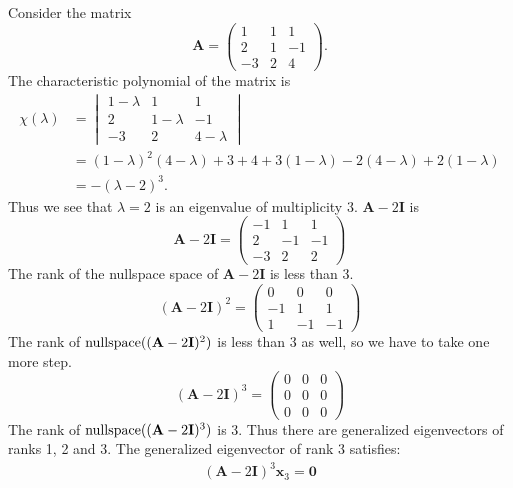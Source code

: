 \begin{Example}
  \label{example_gen_eigenvec_111}
  Consider the matrix
  \[
  \mathbf{A} = 
  \begin{pmatrix}
    1 & 1 & 1 \\
    2 & 1 & -1 \\
    -3 & 2 & 4 
  \end{pmatrix}.
  \]
  The characteristic polynomial of the matrix is
  \begin{align*}
    \chi(\lambda)
    &= \begin{vmatrix}
      1 - \lambda  & 1             & 1 \\
      2               & 1 - \lambda        & -1 \\
      -3              & 2             & 4 - \lambda
    \end{vmatrix} \\
    &= (1-\lambda)^2 (4 - \lambda) + 3 + 4 +3 (1-\lambda)
    -2 (4-\lambda) + 2 (1-\lambda) \\
    &= - (\lambda - 2)^3.
  \end{align*}
  Thus we see that $\lambda = 2$ is an eigenvalue of multiplicity 3.  
  $\mathbf{A} - 2 \mathbf{I}$ is
  \[
  \mathbf{A}  - 2 \mathbf{I}
  =
  \begin{pmatrix}
    -1 & 1 & 1 \\
    2 & -1 & -1 \\
    -3 & 2 & 2 
  \end{pmatrix}
  \]
  The rank of the nullspace space of $\mathbf{A} - 2 \mathbf{I}$ is less than 3.
  \[
  (\mathbf{A}  - 2 \mathbf{I})^2
  =
  \begin{pmatrix}
    0 & 0 & 0 \\
    -1 & 1 & 1 \\
    1 & -1 & -1 
  \end{pmatrix}
  \]
  The rank of $\mathop{\mathrm{nullspace}}\nolimits((\mathbf{A} - 2 \mathbf{I})^2)$ is less than 3 as well, so we have to 
  take one more step.
  \[
  (\mathbf{A}  - 2 \mathbf{I})^3
  =
  \begin{pmatrix}
    0 & 0 & 0 \\
    0 & 0 & 0 \\
    0 & 0 & 0
  \end{pmatrix}
  \]
  The rank of $\mathop{\mathrm{nullspace}}\nolimits((\mathbf{A} - 2 \mathbf{I})^3)$ is 3.  Thus there are generalized
  eigenvectors of ranks 1, 2 and 3.  The generalized eigenvector of rank 3
  satisfies:
  \begin{gather*}
    (\mathbf{A}  - 2 \mathbf{I})^3 \mathbf{x}_{3} = \mathbf{0} \\

\end{gather*}
\end{Example}
